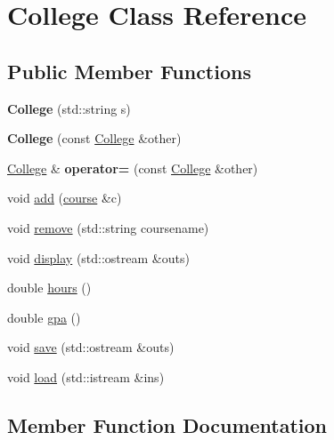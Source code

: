 \hypertarget{class_college}{}\section{College Class Reference}
\label{class_college}
\subsection*{Public Member Functions}
\begin{DoxyCompactItemize}
\item 
\mbox{\label{class_college_adabaf4087355e83f9f7d39f1e1498b41}} 
{\bfseries College} (std\+::string s)
\item 
\mbox{\label{class_college_ad007ad488e5a7ef986114080d0c8e101}} 
{\bfseries College} (const \hyperlink{class_college}{College} \&other)
\item 
\mbox{\label{class_college_af2194c9b37f80d13dc3fdba6784b18e8}} 
\hyperlink{class_college}{College} \& {\bfseries operator=} (const \hyperlink{class_college}{College} \&other)
\item 
void \hyperlink{class_college_a67fd1d8970b46b24ce2e0dd72598a22f}{add} (\hyperlink{classcourse}{course} \&c)
\item 
void \hyperlink{class_college_a4d2ae513b36e6421fb1ca2c08459cfe6}{remove} (std\+::string coursename)
\item 
void \hyperlink{class_college_a52ca0a164483cf5c05591cd0fb8b300c}{display} (std\+::ostream \&outs)
\item 
double \hyperlink{class_college_a8a7a762611a1d7e00c453390d49355fd}{hours} ()
\item 
double \hyperlink{class_college_aaf9bfaa0bc717e96da6365661a96fcd0}{gpa} ()
\item 
void \hyperlink{class_college_af6b419f813bc990c0e11f99b78a26899}{save} (std\+::ostream \&outs)
\item 
void \hyperlink{class_college_a11422094ddd907705daede7aa537dd73}{load} (std\+::istream \&ins)
\end{DoxyCompactItemize}


\subsection{Member Function Documentation}
\mbox{\label{class_college_a67fd1d8970b46b24ce2e0dd72598a22f}} 
